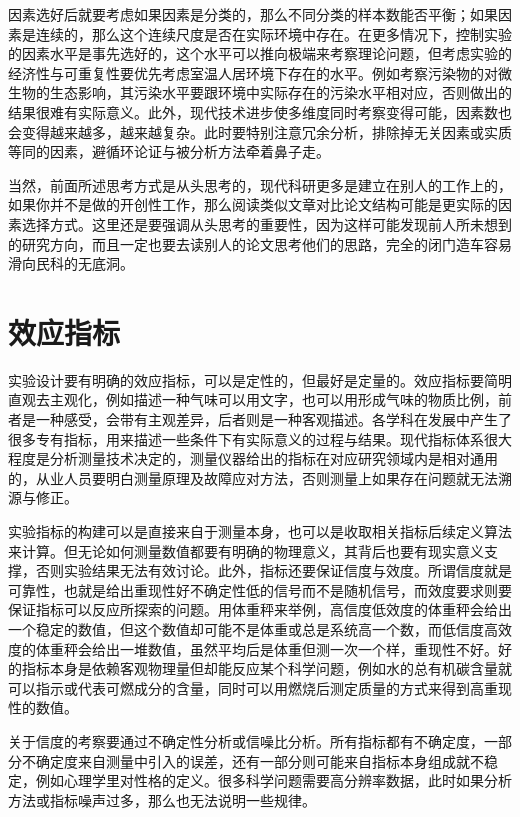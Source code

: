 \documentclass[]{tufte-book}
\begin{document}
因素选好后就要考虑如果因素是分类的，那么不同分类的样本数能否平衡；如果因素是连续的，那么这个连续尺度是否在实际环境中存在。在更多情况下，控制实验的因素水平是事先选好的，这个水平可以推向极端来考察理论问题，但考虑实验的经济性与可重复性要优先考虑室温人居环境下存在的水平。例如考察污染物的对微生物的生态影响，其污染水平要跟环境中实际存在的污染水平相对应，否则做出的结果很难有实际意义。此外，现代技术进步使多维度同时考察变得可能，因素数也会变得越来越多，越来越复杂。此时要特别注意冗余分析，排除掉无关因素或实质等同的因素，避循环论证与被分析方法牵着鼻子走。

当然，前面所述思考方式是从头思考的，现代科研更多是建立在别人的工作上的，如果你并不是做的开创性工作，那么阅读类似文章对比论文结构可能是更实际的因素选择方式。这里还是要强调从头思考的重要性，因为这样可能发现前人所未想到的研究方向，而且一定也要去读别人的论文思考他们的思路，完全的闭门造车容易滑向民科的无底洞。

\hypertarget{ux6548ux5e94ux6307ux6807}{%
\section{效应指标}\label{ux6548ux5e94ux6307ux6807}}

实验设计要有明确的效应指标，可以是定性的，但最好是定量的。效应指标要简明直观去主观化，例如描述一种气味可以用文字，也可以用形成气味的物质比例，前者是一种感受，会带有主观差异，后者则是一种客观描述。各学科在发展中产生了很多专有指标，用来描述一些条件下有实际意义的过程与结果。现代指标体系很大程度是分析测量技术决定的，测量仪器给出的指标在对应研究领域内是相对通用的，从业人员要明白测量原理及故障应对方法，否则测量上如果存在问题就无法溯源与修正。

实验指标的构建可以是直接来自于测量本身，也可以是收取相关指标后续定义算法来计算。但无论如何测量数值都要有明确的物理意义，其背后也要有现实意义支撑，否则实验结果无法有效讨论。此外，指标还要保证信度与效度。所谓信度就是可靠性，也就是给出重现性好不确定性低的信号而不是随机信号，而效度要求则要保证指标可以反应所探索的问题。用体重秤来举例，高信度低效度的体重秤会给出一个稳定的数值，但这个数值却可能不是体重或总是系统高一个数，而低信度高效度的体重秤会给出一堆数值，虽然平均后是体重但测一次一个样，重现性不好。好的指标本身是依赖客观物理量但却能反应某个科学问题，例如水的总有机碳含量就可以指示或代表可燃成分的含量，同时可以用燃烧后测定质量的方式来得到高重现性的数值。

关于信度的考察要通过不确定性分析或信噪比分析。所有指标都有不确定度，一部分不确定度来自测量中引入的误差，还有一部分则可能来自指标本身组成就不稳定，例如心理学里对性格的定义。很多科学问题需要高分辨率数据，此时如果分析方法或指标噪声过多，那么也无法说明一些规律。
\end{document}
